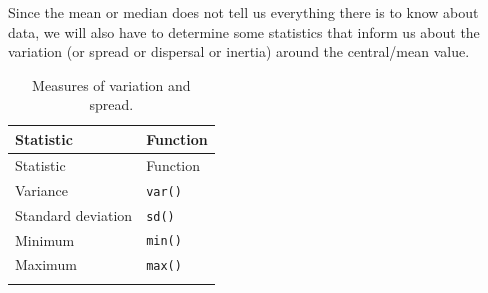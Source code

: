 \documentclass[english,10pt,a4paper,oneside]{book}
\theoremstyle{definition}
\theoremstyle{definition}
\theoremstyle{definition}
\theoremstyle{remark}
\begin{document}
Since the mean or median does not tell us everything there is to know
about data, we will also have to determine some statistics that inform
us about the variation (or spread or dispersal or inertia) around the
central/mean value.

\begin{longtable}[]{@{}ll@{}}
\caption{Measures of variation and spread.}\tabularnewline
\toprule
\begin{minipage}[b]{0.29\columnwidth}\raggedright\strut
Statistic\strut
\end{minipage} & \begin{minipage}[b]{0.29\columnwidth}\raggedright\strut
Function\strut
\end{minipage}\tabularnewline
\midrule
\endfirsthead
\toprule
\begin{minipage}[b]{0.29\columnwidth}\raggedright\strut
Statistic\strut
\end{minipage} & \begin{minipage}[b]{0.29\columnwidth}\raggedright\strut
Function\strut
\end{minipage}\tabularnewline
\midrule
\endhead
\begin{minipage}[t]{0.29\columnwidth}\raggedright\strut
Variance\strut
\end{minipage} & \begin{minipage}[t]{0.29\columnwidth}\raggedright\strut
\texttt{var()}\strut
\end{minipage}\tabularnewline
\begin{minipage}[t]{0.29\columnwidth}\raggedright\strut
Standard deviation\strut
\end{minipage} & \begin{minipage}[t]{0.29\columnwidth}\raggedright\strut
\texttt{sd()}\strut
\end{minipage}\tabularnewline
\begin{minipage}[t]{0.29\columnwidth}\raggedright\strut
Minimum\strut
\end{minipage} & \begin{minipage}[t]{0.29\columnwidth}\raggedright\strut
\texttt{min()}\strut
\end{minipage}\tabularnewline
\begin{minipage}[t]{0.29\columnwidth}\raggedright\strut
Maximum\strut
\end{minipage} & \begin{minipage}[t]{0.29\columnwidth}\raggedright\strut
\texttt{max()}\strut
\end{minipage}\tabularnewline
\begin{minipage}[t]{0.29\columnwidth}\raggedright\strut

\end{minipage}
\end{longtable}
\end{document}
